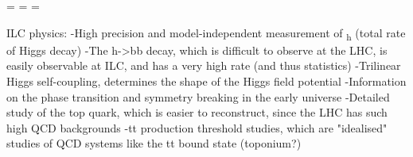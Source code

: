 =	=	=

ILC physics:
-High precision and model-independent measurement of \Gamma\textsubscript{h} (total rate of Higgs decay)
-The h->bb decay, which is difficult to observe at the LHC, is easily observable at ILC, and has a very high rate (and thus statistics)
-Trilinear Higgs self-coupling, determines the shape of the Higgs field potential
	-Information on the phase transition and symmetry breaking in the early universe
-Detailed study of the top quark, which is easier to reconstruct, since the LHC has such high QCD backgrounds
-tt production threshold studies, which are "idealised" studies of QCD systems like the tt bound state (toponium?)



